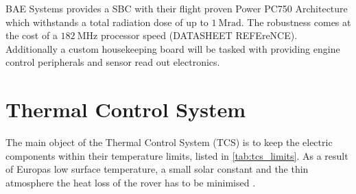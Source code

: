 BAE Systems provides a SBC with their flight proven Power PC750 Architecture which withstands a total radiation dose of up to $1~\text{Mrad}$. The robustness comes at the cost of a $182~\text{MHz}$ processor speed (DATASHEET REFEreNCE). \\

Additionally a custom housekeeping board will be tasked with providing engine control peripherals and sensor read out electronics. 

\section{Thermal Control System} \label{sec:thermalcontrol}
The main object of the Thermal Control System (TCS) is to keep the electric components within their temperature limits, listed in \autoref{tab:tcs_limits}.
As a result of Europas low surface temperature, a small solar constant and the thin atmosphere the heat loss of the rover has to be minimised  \cite{Europa}.

